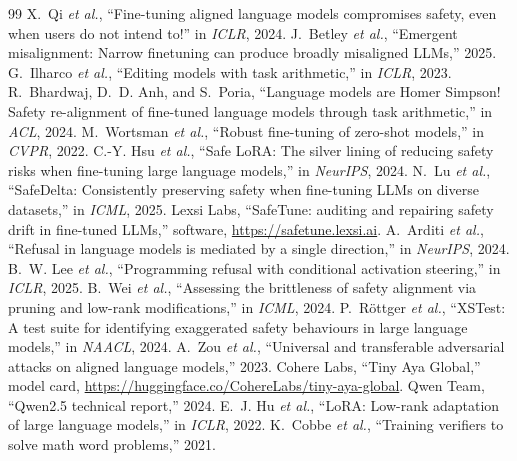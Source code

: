 \documentclass[conference]{IEEEtran}
\begin{document}
\begin{thebibliography}{99}
 X.~Qi \emph{et al.}, ``Fine-tuning aligned language models compromises safety, even when users do not intend to!'' in \emph{ICLR}, 2024.
 J.~Betley \emph{et al.}, ``Emergent misalignment: Narrow finetuning can produce broadly misaligned LLMs,'' 2025.
 G.~Ilharco \emph{et al.}, ``Editing models with task arithmetic,'' in \emph{ICLR}, 2023.
 R.~Bhardwaj, D.~D. Anh, and S.~Poria, ``Language models are Homer Simpson! Safety re-alignment of fine-tuned language models through task arithmetic,'' in \emph{ACL}, 2024.
 M.~Wortsman \emph{et al.}, ``Robust fine-tuning of zero-shot models,'' in \emph{CVPR}, 2022.
 C.-Y. Hsu \emph{et al.}, ``Safe LoRA: The silver lining of reducing safety risks when fine-tuning large language models,'' in \emph{NeurIPS}, 2024.
 N.~Lu \emph{et al.}, ``SafeDelta: Consistently preserving safety when fine-tuning LLMs on diverse datasets,'' in \emph{ICML}, 2025.
 Lexsi Labs, ``SafeTune: auditing and repairing safety drift in fine-tuned LLMs,'' software, \url{https://safetune.lexsi.ai}.
 A.~Arditi \emph{et al.}, ``Refusal in language models is mediated by a single direction,'' in \emph{NeurIPS}, 2024.
 B.~W. Lee \emph{et al.}, ``Programming refusal with conditional activation steering,'' in \emph{ICLR}, 2025.
 B.~Wei \emph{et al.}, ``Assessing the brittleness of safety alignment via pruning and low-rank modifications,'' in \emph{ICML}, 2024.
 P.~R{\"o}ttger \emph{et al.}, ``XSTest: A test suite for identifying exaggerated safety behaviours in large language models,'' in \emph{NAACL}, 2024.
 A.~Zou \emph{et al.}, ``Universal and transferable adversarial attacks on aligned language models,'' 2023.
 Cohere Labs, ``Tiny Aya Global,'' model card, \url{https://huggingface.co/CohereLabs/tiny-aya-global}.
 Qwen Team, ``Qwen2.5 technical report,'' 2024.
 E.~J. Hu \emph{et al.}, ``LoRA: Low-rank adaptation of large language models,'' in \emph{ICLR}, 2022.
 K.~Cobbe \emph{et al.}, ``Training verifiers to solve math word problems,'' 2021.
\end{thebibliography}
\end{document}
